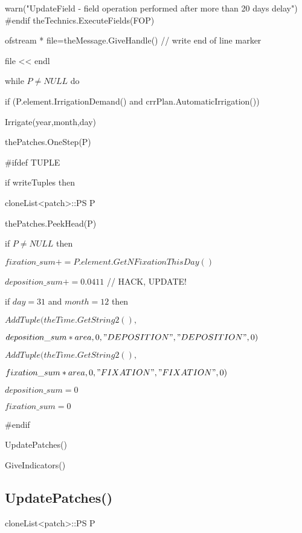 \documentclass[%
]{scrartcl}
\begin{document}
{{{    \quad \quad                     warn("UpdateField - field operation performed after more than 20 days delay")
                  }
\#endif
      \quad \quad             theTechnics.ExecuteFields(FOP)
      
 \quad \quad                  ofstream * file=theMessage.GiveHandle()   // write end of line marker
          
          \quad \quad         *file << endl

     
      while $P \ne NULL$ do
      
	  \quad     if (P.element.IrrigationDemand() and crrPlan.AutomaticIrrigation())
	  
   	\quad \quad       Irrigate(year,month,day)
   	
   \quad \quad    	thePatches.OneStep(P)
      

\#ifdef TUPLE

      if writeTuples then
      
       \quad   cloneList<patch>::PS P
      
       \quad   thePatches.PeekHead(P)
       
       \quad   if $P\ne NULL$ then
         
    
      \quad \quad       $fixation\_sum+=P.element.GetNFixationThisDay()$
    
     \quad \quad       $ deposition\_sum+=0.0411 $ // HACK, UPDATE! 
        
      \quad \quad    if  $day=31$ and $month=12$ then
      
        \quad    \quad \quad  $AddTuple(theTime.GetString2(),$

\quad    \quad \quad \quad  $deposition\_sum*area,0,"DEPOSITION","DEPOSITION",0)$
      
       \quad     \quad \quad  $AddTuple(theTime.GetString2(),$

\quad   \quad   \quad \quad $fixation\_sum*area,0,"FIXATION","FIXATION",0)$
     
       \quad  \quad \quad    $ deposition\_sum=0$
      
       \quad \quad \quad     $ fixation\_sum=0$
       
\#endif

      UpdatePatches()

		GiveIndicators()



\subsection{UpdatePatches()}
cloneList<patch>::PS P

}}
\end{document}

